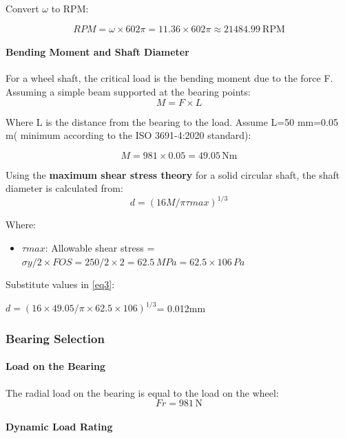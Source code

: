 \documentclass[../../main]{subfiles}
\begin{document}
Convert $\omega$ to RPM:

$$ RPM = \omega \times 602\pi = 11.36 \times 602\pi \approx 21484.99 \  \text{RPM}$$

\paragraph{Bending Moment and Shaft Diameter}

For a wheel shaft, the critical load is the bending moment due to the
force F. Assuming a simple beam supported at the bearing points:
\begin{equation}
  M = F \times L
\label{eq2}
\end{equation}

Where L is the distance from the bearing to the load. Assume
L=50 mm=0.05 \\m( minimum according to the ISO 3691-4:2020 standard):

$$ M = 981 \times 0.05 = 49.05\, \text{Nm}$$

Using the \textbf{maximum shear stress theory} for a solid circular
shaft, the shaft diameter is calculated from:
\begin{equation}  
 d = (16M/\pi\tau max)^{1/3} 
 \label{eq3}
\end{equation}

Where:

\begin{itemize}
\item
  \(\tau max\): Allowable shear stress =
  \(\sigma y/2 \times FOS = 250/2 \times 2 = 62.5\, MPa = 62.5 \times 106\, Pa\)
\end{itemize}

Substitute values in \cref{eq3}:

\(d = (16 \times 49.05/\pi \times 62.5 \times 106)^{1/3}\)= 0.012mm

\subsubsection{Bearing Selection}

\paragraph{ Load on the Bearing}

The radial load on the bearing is equal to the load on the wheel:
$$Fr = 981\, \text{N}$$

\paragraph{Dynamic Load Rating}
\end{document}
